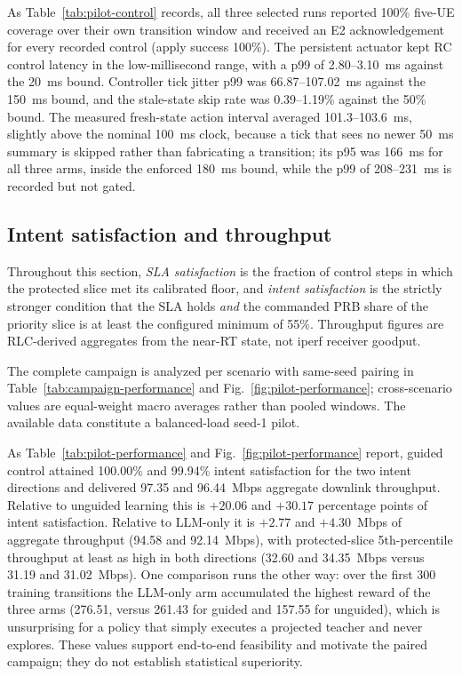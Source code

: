 As Table~\ref{tab:pilot-control} records, all three selected runs reported 100\% five-UE
coverage over their own transition window and received an E2 acknowledgement for every
recorded control (apply success 100\%). The
persistent actuator kept RC control latency in the low-millisecond range, with a p99 of
2.80--3.10~ms against the 20~ms bound. Controller tick jitter p99 was 66.87--107.02~ms against
the 150~ms bound, and the stale-state skip rate was 0.39--1.19\% against the 50\% bound. The
measured fresh-state action interval averaged 101.3--103.6~ms, slightly above the nominal
100~ms clock, because a tick that sees no newer 50~ms summary is skipped rather than
fabricating a transition; its p95 was 166~ms for all three arms, inside the enforced 180~ms
bound, while the p99 of 208--231~ms is recorded but not gated.
\FloatBarrier

\subsection{Intent satisfaction and throughput}
Throughout this section, \emph{SLA satisfaction} is the fraction of control steps in which the
protected slice met its calibrated floor, and \emph{intent satisfaction} is the strictly
stronger condition that the SLA holds \emph{and} the commanded PRB share of the priority slice
is at least the configured minimum of 55\%. Throughput figures are RLC-derived aggregates from
the near-RT state, not iperf receiver goodput.

\ifFullCampaign
{}
The complete campaign is analyzed per scenario with same-seed pairing in
Table~\ref{tab:campaign-performance} and Fig.~\ref{fig:pilot-performance}; cross-scenario values are equal-weight macro averages rather than pooled windows.
\else
The available data constitute a balanced-load seed-1 pilot.

As Table~\ref{tab:pilot-performance} and Fig.~\ref{fig:pilot-performance} report, guided
control attained 100.00\% and 99.94\% intent satisfaction for the two intent directions
and delivered 97.35 and 96.44~Mbps aggregate downlink throughput. Relative to unguided
learning this is $+20.06$ and $+30.17$ percentage points of intent satisfaction. Relative to
LLM-only it is $+2.77$ and $+4.30$~Mbps of aggregate throughput (94.58 and 92.14~Mbps), with
protected-slice 5th-percentile throughput at least as high in both directions (32.60 and
34.35~Mbps versus 31.19 and 31.02~Mbps). One comparison runs the other way: over the first 300
training transitions the LLM-only arm accumulated the highest reward of the three arms
(276.51, versus 261.43 for guided and 157.55 for unguided), which is unsurprising for a policy
that simply executes a projected teacher and never explores. These values support end-to-end
feasibility and motivate the paired campaign; they do not establish statistical superiority.


